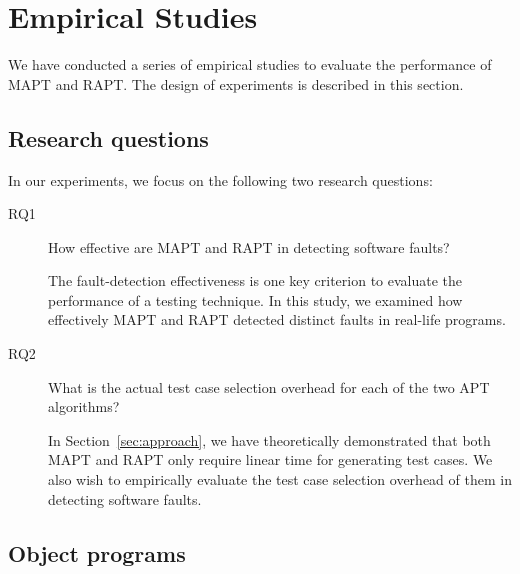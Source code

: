 \documentclass[10pt,journal,compsoc]{IEEEtran}
\begin{document}
\section{Empirical Studies}
\label{sec:exp}

We have conducted a series of empirical studies to evaluate the performance of MAPT and RAPT. The design of experiments is described in this section.

\subsection{Research questions}

In our experiments, we focus on the following two research questions:

\begin{description}
\item [RQ1] How effective are MAPT and RAPT in detecting software faults?

The fault-detection effectiveness is one key criterion to evaluate the performance of a testing technique. In this study, we examined how effectively MAPT and RAPT detected distinct faults in real-life programs.
\item [RQ2] What is the actual test case selection overhead for each of the two APT algorithms?

In Section~\ref{sec:approach}, we have theoretically demonstrated that both MAPT and RAPT only require linear time for generating test cases. We also wish to empirically evaluate the test case selection overhead of them in detecting software faults.
\end{description}

\subsection{Object programs}
\end{document}
